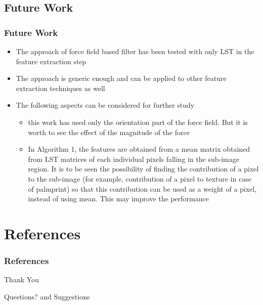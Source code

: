 \documentclass{beamer}
\begin{document}
\subsection*{Future Work}
\begin{frame}
\frametitle{Future Work}
	\begin{itemize}
		\item The approach of force field based filter has been tested with only LST in the feature extraction step
		\item The approach is generic enough and can be applied to other feature extraction techniques as well
		\item The following aspects can be considered for further study
		\begin{itemize}
			\item this work has used only the orientation part of the force field. But it is worth to see the effect of the magnitude of the force
			\item In Algorithm 1, the features are obtained from a mean matrix obtained from LST matrices of each individual pixels falling in the sub-image region. It is to be seen the possibility of finding the contribution of a pixel to the sub-image (for example, contribution of a pixel to texture in case of palmprint) so that this contribution can be used as a weight of a pixel, instead of using mean. This may improve the performance
		\end{itemize}
	\end{itemize}
\end{frame}

\section{References}
\begin{frame}[allowframebreaks]
\frametitle{References}

\end{frame}

\begin{frame}
\begin{block}{}
\begin{center}Thank You \end{center}
\end{block}
\end{frame}
\begin{frame}
\begin{block}{}
\begin{center}Questions? and Suggestions  \end{center}
\end{block} 
\end{frame}
\end{document}
